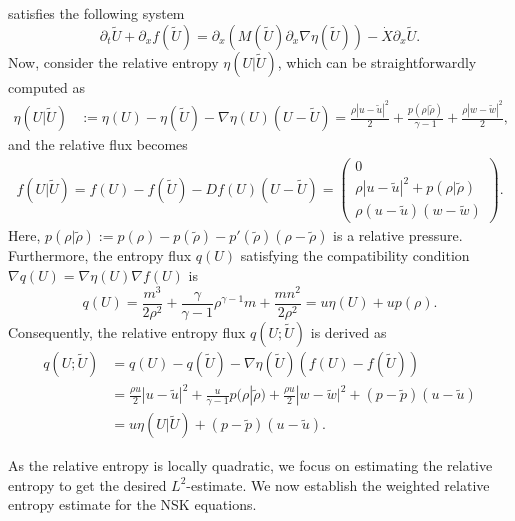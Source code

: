 \documentclass[11pt,reqno]{amsart}
\numberwithin{equation}{section} %
\newcommand{\pa}{\partial}
\begin{document}
satisfies the following system
\begin{equation}\label{eq:system_shock}
	\pa_t \tilde{U} +\pa_x f(\tilde{U}) = \pa_x(M(\tilde{U})\pa_x\nabla\eta(\tilde{U}))-\dot{X}\pa_x\tilde{U}.
\end{equation}
Now, consider the relative entropy $\eta(U|\tilde{U})$, which can be straightforwardly computed as
\begin{align*}
    \eta(U|\tilde{U})&:=\eta(U)-\eta(\widetilde{U})-\nabla\eta(U)(U-\widetilde{U})=\frac{\rho|u-\tilde{u}|^2}{2}+\frac{p(\rho|\tilde{\rho})}{\gamma-1}+\frac{\rho|w-\tilde{w}|^2}{2},
\end{align*}
and the relative flux becomes
\begin{align*}
    f(U|\tilde{U}) =f(U)-f(\widetilde{U})-D f(U)(U-\widetilde{U})=\begin{pmatrix}
	0\\ \rho|u-\tilde{u}|^2+p(\rho|\tilde{\rho})\\\rho(u-\tilde{u})(w-\tilde{w})
\end{pmatrix}.
\end{align*}
Here, $p(\rho|\tilde{\rho}):=p(\rho)-p(\tilde{\rho})-p'(\tilde{\rho})(\rho-\tilde{\rho})$ is a relative pressure. Furthermore, the entropy flux $q(U)$ satisfying the compatibility condition $\nabla q(U) = \nabla \eta(U)\nabla f(U)$ is
\[q(U) = \frac{m^3}{2\rho^2}+\frac{\gamma}{\gamma-1}\rho^{\gamma-1}m+\frac{mn^2}{2\rho^2} = u\eta(U) + up(\rho).\]
Consequently, the relative entropy flux $q(U;\tilde{U})$ is derived as
\begin{align*}
	q(U;\tilde{U})&=q(U)-q(\tilde{U})-\nabla\eta(\tilde{U})(f(U)-f(\tilde{U}))\\
	&=\frac{\rho u}{2}|u-\tilde{u}|^2+\frac{u}{\gamma-1}p(\rho|\tilde{\rho}) +\frac{\rho u}{2}|w-\tilde{w}|^2 +(p-\tilde{p})(u-\tilde{u})\\
	&=u\eta(U|\tilde{U})+(p-\tilde{p})(u-\tilde{u}).
\end{align*}

As the relative entropy is locally quadratic, we focus on estimating the relative entropy to get the desired $L^2$-estimate. We now establish the weighted relative entropy estimate for the NSK equations.
\end{document}
